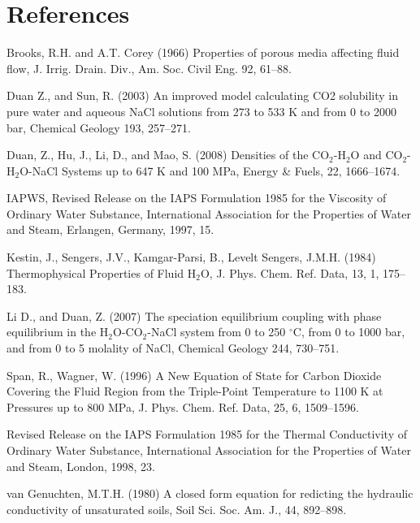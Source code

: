 \documentclass[12pt]{article}
\begin{document}
\section{References}
\begin{description}
\item Brooks, R.H. and A.T. Corey (1966) Properties of porous media affecting fluid flow, J. Irrig. Drain. Div., Am. Soc. Civil Eng. 92, 61--88.

\item Duan Z., and Sun, R. (2003) An improved model calculating CO2 solubility in pure water and aqueous NaCl solutions from 273 to 533 K and from 0 to 2000 bar, Chemical Geology 193, 257--271.

\item Duan, Z., Hu, J., Li, D., and Mao, S. (2008) Densities of the CO$_2$-H$_2$O and CO$_2$-H$_2$O-NaCl Systems up to 647 K and 100 MPa, Energy \& Fuels, 22, 1666--1674.

\item IAPWS, Revised Release on the IAPS Formulation 1985 for the Viscosity of Ordinary Water Substance, International Association for the Properties of Water and Steam, Erlangen, Germany, 1997, 15.

\item Kestin, J., Sengers, J.V., Kamgar-Parsi, B., Levelt Sengers, J.M.H. (1984) Thermophysical Properties of Fluid H$_2$O, J. Phys. Chem. Ref. Data, 13, 1, 175--183.

\item Li D., and Duan, Z. (2007) The speciation equilibrium coupling with phase equilibrium in the H$_2$O-CO$_2$-NaCl system from 0 to 250 $^\circ$C, from 0 to 1000 bar, and from 0 to 5 molality of NaCl, Chemical Geology 244, 730--751.

\item Span, R., Wagner, W. (1996) A New Equation of State for Carbon Dioxide Covering the Fluid Region from the Triple-Point Temperature to 1100 K at Pressures up to 800 MPa, J. Phys. Chem. Ref. Data, 25, 6, 1509--1596.

\item Revised Release on the IAPS Formulation 1985 for the Thermal Conductivity of Ordinary Water Substance, International Association for the Properties of Water and Steam, London, 1998, 23. 

\item van Genuchten, M.T.H. (1980) A closed form equation for redicting the hydraulic conductivity of unsaturated soils, Soil Sci. Soc. Am. J., 44, 892--898.

\end{description}
\end{document}
